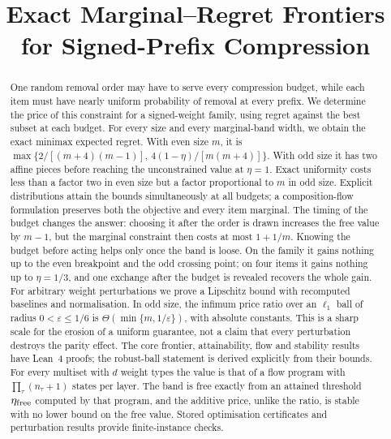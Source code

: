 



\title{Exact Marginal--Regret Frontiers\\for Signed-Prefix Compression}

\author{
}

\maketitle

\begin{abstract}
One random removal order may have to serve every compression budget, while each item must
have nearly uniform probability of removal at every prefix. We determine the price of this
constraint for a signed-weight family, using regret against the best subset at each budget.
For every size and every marginal-band width, we obtain the exact minimax expected regret.
With even size $m$, it is
$\max\{2/[(m+4)(m-1)],\,4(1-\eta)/[m(m+4)]\}$.
With odd size it has two affine pieces before reaching the unconstrained value at $\eta=1$.
Exact uniformity costs less than a factor two in even size but a factor proportional to $m$
in odd size. Explicit distributions attain the bounds simultaneously at all budgets; a
composition-flow formulation preserves both the objective and every item marginal.
The timing of the budget changes the answer: choosing it after the order is drawn increases
the free value by $m-1$, but the marginal constraint then costs at most $1+1/m$.
Knowing the budget before acting helps only once the band is loose. On the family it gains
nothing up to the even breakpoint and the odd crossing point; on four items it gains nothing up
to $\eta=1/3$, and one exchange after the budget is revealed recovers the whole gain.
For arbitrary weight perturbations we prove a Lipschitz bound with recomputed baselines and
normalisation. In odd size, the infimum price ratio over an $\ell_1$ ball of radius
$0<\varepsilon\le1/6$ is $\Theta(\min\{m,1/\varepsilon\})$, with absolute constants.
This is a sharp scale for the erosion of a uniform guarantee, not a claim that every
perturbation destroys the parity effect. The core frontier, attainability, flow and stability
results have Lean~4 proofs; the robust-ball statement is derived explicitly from their bounds.
For every multiset with $d$ weight types the value is that of a flow program with
$\prod_\tau(n_\tau+1)$ states per layer. The band is free exactly from an attained threshold
$\eta_{\rm free}$ computed by that program, and the additive price, unlike the ratio, is stable
with no lower bound on the free value.
Stored optimisation certificates and perturbation results provide finite-instance checks.
\end{abstract}

